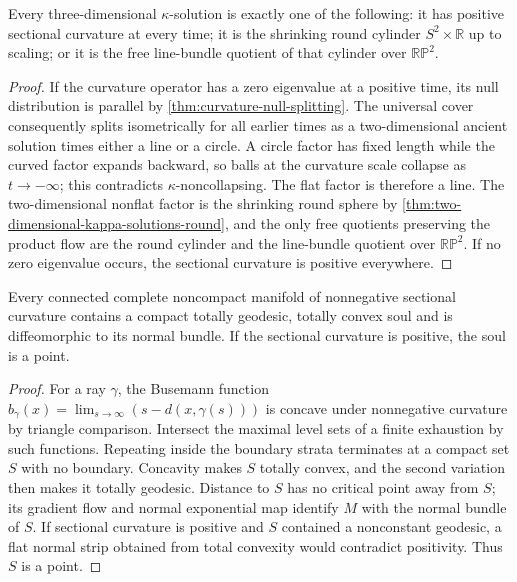 \begin{proposition}
\label{prop:kappa-solution-curvature-trichotomy}
\notready
Every three-dimensional $\kappa$-solution is exactly one of the following:
it has positive sectional curvature at every time; it is the shrinking round
cylinder $S^2\times\mathbb R$ up to scaling; or it is the free line-bundle
quotient of that cylinder over $\mathbb{RP}^2$.
\end{proposition}

\begin{proof}
If the curvature operator has a zero eigenvalue at a positive time, its null
distribution is parallel by \ref{thm:curvature-null-splitting}.  The
universal cover consequently splits isometrically for all earlier times as a
two-dimensional ancient solution times either a line or a circle.  A circle
factor has fixed length while the curved factor expands
backward, so balls at the curvature scale collapse as $t\to-\infty$; this
contradicts $\kappa$-noncollapsing.  The flat factor is therefore a line.
The two-dimensional nonflat factor is the shrinking round sphere by
\ref{thm:two-dimensional-kappa-solutions-round}, and the
only free quotients preserving the product flow are the round cylinder and
the line-bundle quotient over $\mathbb{RP}^2$.  If no zero eigenvalue occurs,
the sectional curvature is positive everywhere.
\end{proof}

\begin{theorem}
\label{thm:soul-structure-nonnegative-curvature}
\notready
Every connected complete noncompact manifold of nonnegative sectional
curvature contains a compact totally geodesic, totally convex soul and is
diffeomorphic to its normal bundle.  If the sectional curvature is positive,
the soul is a point.
\end{theorem}

\begin{proof}
For a ray $\gamma$, the Busemann function
$b_\gamma(x)=\lim_{s\to\infty}(s-d(x,\gamma(s)))$ is concave under
nonnegative curvature by triangle comparison.  Intersect the maximal level
sets of a finite exhaustion by such functions.  Repeating inside the boundary
strata terminates at a compact set $S$ with no boundary.  Concavity makes $S$
totally convex, and the second variation then makes it totally geodesic.
Distance to $S$ has no critical point away from $S$; its gradient flow and
normal exponential map identify $M$ with the normal bundle of $S$.  If
sectional curvature is positive and $S$ contained a nonconstant geodesic, a
flat normal strip obtained from total convexity would contradict positivity.
Thus $S$ is a point.
\end{proof}

